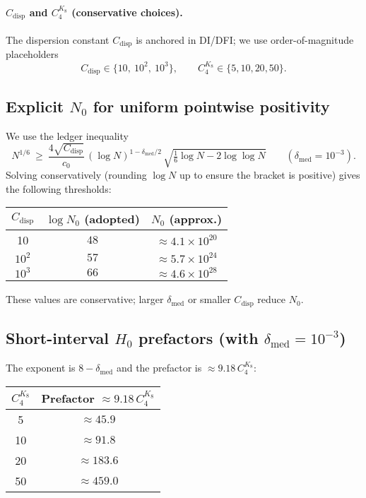 \documentclass[11pt]{article}
\theoremstyle{definition}
\theoremstyle{remark}
\begin{document}
\paragraph{$C_{\mathrm{disp}}$ and $C_4^{K_8}$ (conservative choices).}
The dispersion constant $C_{\mathrm{disp}}$ is anchored in DI/DFI; we use order-of-magnitude placeholders
\[
  C_{\mathrm{disp}}\in\{10,\ 10^2,\ 10^3\},\qquad C_4^{K_8}\in\{5,10,20,50\}.
\]

\subsection*{Explicit $N_0$ for uniform pointwise positivity}
We use the ledger inequality
\[
  N^{1/6}\ \ge\ \frac{4\sqrt{C_{\mathrm{disp}}}}{c_0}\, (\log N)^{1-\delta_{\mathrm{med}}/2}\,\sqrt{\tfrac16\log N-2\log\log N}\qquad (\delta_{\mathrm{med}}=10^{-3}).
\]
Solving conservatively (rounding $\log N$ up to ensure the bracket is positive) gives the following thresholds:
\begin{center}
\begin{tabular}{c|c|c}
$C_{\mathrm{disp}}$ & $\log N_0$ (adopted) & $N_0$ (approx.) \\
\hline
10 & $48$ & $\approx 4.1\times 10^{20}$ \\
$10^2$ & $57$ & $\approx 5.7\times 10^{24}$ \\
$10^3$ & $66$ & $\approx 4.6\times 10^{28}$ \\
\end{tabular}
\end{center}
These values are conservative; larger $\delta_{\mathrm{med}}$ or smaller $C_{\mathrm{disp}}$ reduce $N_0$.

\subsection*{Short-interval $H_0$ prefactors (with $\delta_{\mathrm{med}}=10^{-3}$)}
The exponent is $8-\delta_{\mathrm{med}}$ and the prefactor is $\approx 9.18\,C_4^{K_8}$:
\begin{center}
\begin{tabular}{c|c}
$C_4^{K_8}$ & Prefactor $\approx 9.18\,C_4^{K_8}$ \\
\hline
5 & $\approx 45.9$ \\
10 & $\approx 91.8$ \\
20 & $\approx 183.6$ \\
50 & $\approx 459.0$ \\
\end{tabular}
\end{center}
\end{document}
